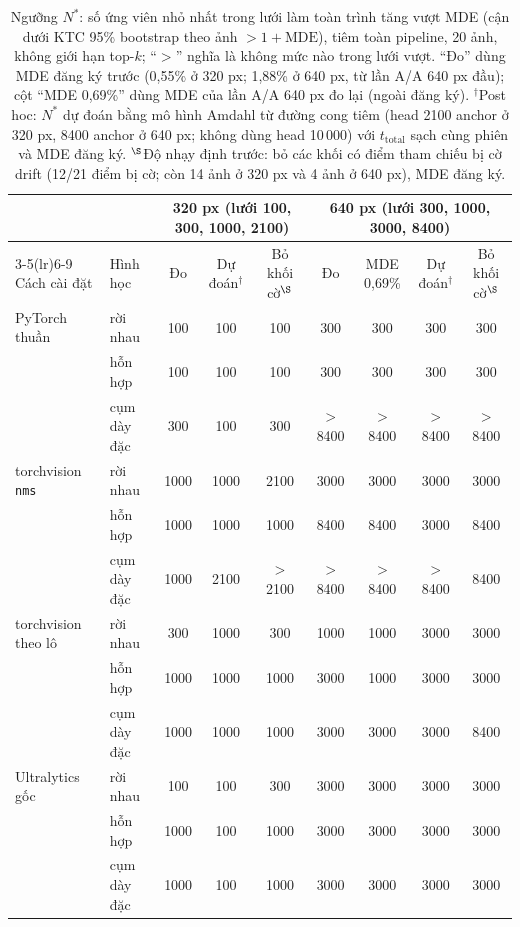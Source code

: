 \begin{table}[t]
\centering\small
\caption{Ngưỡng $N^{*}$: số ứng viên nhỏ nhất trong lưới làm toàn trình tăng vượt MDE (cận dưới KTC 95\% bootstrap theo ảnh $>1+\mathrm{MDE}$), tiêm toàn pipeline, 20 ảnh, không giới hạn top-$k$; ``$>$'' nghĩa là không mức nào trong lưới vượt. ``Đo'' dùng MDE đăng ký trước (0,55\% ở 320 px; 1,88\% ở 640 px, từ lần A/A 640 px đầu); cột ``MDE 0,69\%'' dùng MDE của lần A/A 640 px đo lại (ngoài đăng ký). $^{\dagger}$Post hoc: $N^{*}$ dự đoán bằng mô hình Amdahl từ đường cong tiêm (head 2100 anchor ở 320 px, 8400 anchor ở 640 px; không dùng head 10\,000) với $t_{\mathrm{total}}$ sạch cùng phiên và MDE đăng ký. $^{\S}$Độ nhạy định trước: bỏ các khối có điểm tham chiếu bị cờ drift (12/21 điểm bị cờ; còn 14 ảnh ở 320 px và 4 ảnh ở 640 px), MDE đăng ký.}
\label{tab:nstar}
\begin{tabular}{@{}llccccccc@{}}
\toprule
 & & \multicolumn{3}{c}{320 px (lưới 100, 300, 1000, 2100)} & \multicolumn{4}{c}{640 px (lưới 300, 1000, 3000, 8400)} \\
\cmidrule(lr){3-5}\cmidrule(lr){6-9}
Cách cài đặt & Hình học & Đo & Dự đoán$^{\dagger}$ & Bỏ khối cờ$^{\S}$ & Đo & MDE 0,69\% & Dự đoán$^{\dagger}$ & Bỏ khối cờ$^{\S}$ \\
\midrule
PyTorch thuần & rời nhau & 100 & 100 & 100 & 300 & 300 & 300 & 300 \\
 & hỗn hợp & 100 & 100 & 100 & 300 & 300 & 300 & 300 \\
 & cụm dày đặc & 300 & 100 & 300 & $>$8400 & $>$8400 & $>$8400 & $>$8400 \\
torchvision \texttt{nms} & rời nhau & 1000 & 1000 & 2100 & 3000 & 3000 & 3000 & 3000 \\
 & hỗn hợp & 1000 & 1000 & 1000 & 8400 & 8400 & 3000 & 8400 \\
 & cụm dày đặc & 1000 & 2100 & $>$2100 & $>$8400 & $>$8400 & $>$8400 & 8400 \\
torchvision theo lô & rời nhau & 300 & 1000 & 300 & 1000 & 1000 & 3000 & 3000 \\
 & hỗn hợp & 1000 & 1000 & 1000 & 3000 & 1000 & 3000 & 3000 \\
 & cụm dày đặc & 1000 & 1000 & 1000 & 3000 & 3000 & 3000 & 8400 \\
Ultralytics gốc & rời nhau & 100 & 100 & 300 & 3000 & 3000 & 3000 & 3000 \\
 & hỗn hợp & 1000 & 100 & 1000 & 3000 & 3000 & 3000 & 3000 \\
 & cụm dày đặc & 1000 & 100 & 1000 & 3000 & 3000 & 3000 & 3000 \\
\bottomrule
\end{tabular}
\end{table}
